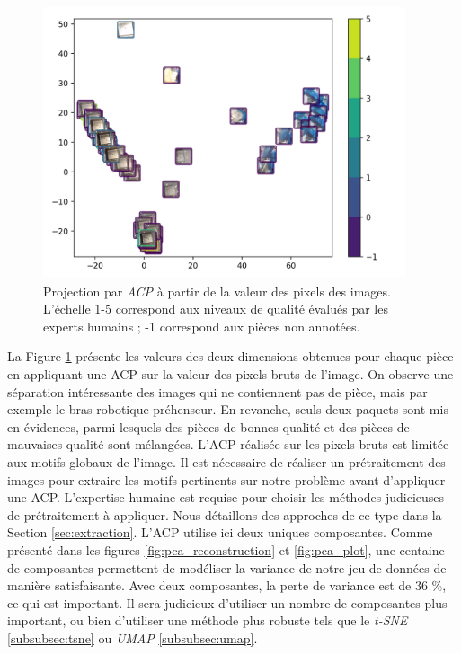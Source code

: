 \begin{figure}[hbtp]
    \centering
    \includegraphics[width=0.95\textwidth,height=\textheight,keepaspectratio]{../Chap4/Figures/visualize_PCA_pixel_space.png}
    \caption{Projection par \textit{ACP} à partir de la valeur des pixels des images. L'échelle 1-5 correspond aux niveaux de qualité évalués par les experts humains ; -1 correspond aux pièces non annotées.}
    \label{fig:ACP}
\end{figure}

La Figure \ref{fig:ACP} présente les valeurs des deux dimensions obtenues pour chaque pièce en appliquant une ACP sur la valeur des pixels bruts de l'image.
On observe une séparation intéressante des images qui ne contiennent pas de pièce, mais par exemple le bras robotique préhenseur.
En revanche, seuls deux paquets sont mis en évidences, parmi lesquels des pièces de bonnes qualité et des pièces de mauvaises qualité sont mélangées.
L'ACP réalisée sur les pixels bruts est limitée aux motifs globaux de l'image.
Il est nécessaire de réaliser un prétraitement des images pour extraire les motifs pertinents sur notre problème avant d'appliquer une ACP.
L'expertise humaine est requise pour choisir les méthodes judicieuses de prétraitement à appliquer.
Nous détaillons des approches de ce type dans la Section \ref{sec:extraction}.
L'ACP utilise ici deux uniques composantes.
Comme présenté dans les figures \ref{fig:pca_reconstruction} et \ref{fig:pca_plot}, une centaine de composantes permettent de modéliser la variance de notre jeu de données de manière satisfaisante.
Avec deux composantes, la perte de variance est de 36 \%, ce qui est important.
Il sera judicieux d'utiliser un nombre de composantes plus important, ou bien d'utiliser une méthode plus robuste tels que le \textit{t-SNE} \ref{subsubsec:tsne} ou \textit{UMAP} \ref{subsubsec:umap}.

